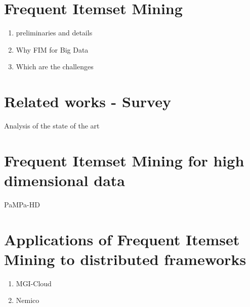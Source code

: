 \documentclass[11pt, a4paper, oneside]{Thesis} %
\begin{document}
\chapter{Frequent Itemset Mining}\label{FIM}
\begin{enumerate}
\item preliminaries and details
\item Why FIM for Big Data
\item Which are the challenges
\end{enumerate}
\chapter{Related works - Survey}
Analysis of the state of the art
\chapter {Frequent Itemset Mining for high dimensional data}
PaMPa-HD
\chapter{Applications of Frequent Itemset Mining to distributed frameworks}
\begin{enumerate}
\item{MGI-Cloud}
\item{Nemico}
\end{enumerate}


\clearpage




\end{document}
